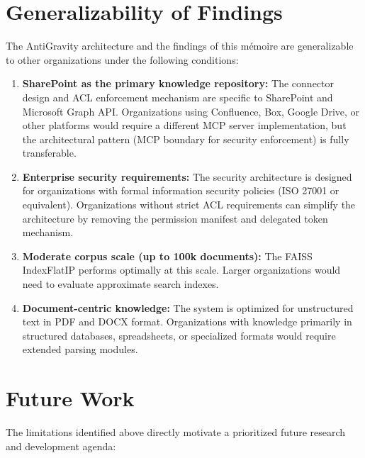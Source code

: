 \section{Generalizability of Findings}
\label{sec:disc-generalizability}

The AntiGravity architecture and the findings of this mémoire are generalizable to other organizations under the following conditions:

\begin{enumerate}
  \item \textbf{SharePoint as the primary knowledge repository:} The connector design and ACL enforcement mechanism are specific to SharePoint and Microsoft Graph API. Organizations using Confluence, Box, Google Drive, or other platforms would require a different MCP server implementation, but the architectural pattern (MCP boundary for security enforcement) is fully transferable.
  \item \textbf{Enterprise security requirements:} The security architecture is designed for organizations with formal information security policies (ISO 27001 or equivalent). Organizations without strict ACL requirements can simplify the architecture by removing the permission manifest and delegated token mechanism.
  \item \textbf{Moderate corpus scale (up to 100k documents):} The FAISS IndexFlatIP performs optimally at this scale. Larger organizations would need to evaluate approximate search indexes.
  \item \textbf{Document-centric knowledge:} The system is optimized for unstructured text in PDF and DOCX format. Organizations with knowledge primarily in structured databases, spreadsheets, or specialized formats would require extended parsing modules.
\end{enumerate}

\section{Future Work}
\label{sec:disc-future}

The limitations identified above directly motivate a prioritized future research and development agenda:

